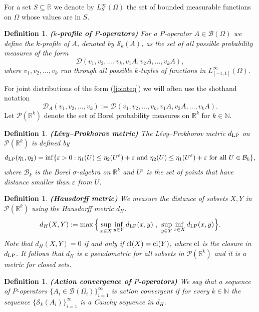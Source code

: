 \documentclass[a4wider]{amsart}
\newtheorem{definition}[theorem]{Definition}
\theoremstyle{definitionbreak}\newtheorem{D}[theorem]{Definition}
\theoremstyle{definitionbreak}\newtheorem*{D*}{Definition}
\begin{document}
For a set $S\subseteq\mathbb{R}$ we denote by $L^\infty_S(\Omega)$ the set of bounded measurable functions on $\Omega$ whose values are in $S$.

\begin{definition} {\bf ($k$-profile of $P$-operators)} For a $P$-operator $A\in\mathcal{B}(\Omega)$ we define the $k$-profile of $A$, denoted by $\mathcal{S}_k(A)$, as the set of all possible probability measures of the form
\begin{equation}\label{jointeq}
\mathcal{D}(v_1,v_2,\dots,v_k,v_1A,v_2A,\dots,v_kA),
\end{equation}
where $v_1,v_2,\dots,v_k$ run through all possible $k$-tuples of functions in $L^\infty_{[-1,1]}(\Omega)$.
\end{definition}    

For joint distributions of the form (\ref{jointeq}) we will often use the shothand notation
$$\mathcal{D}_A(v_1,v_2,\dots,v_k):=\mathcal{D}(v_1,v_2,\dots,v_k,v_1A,v_2A,\dots,v_kA).$$
Let $\mathcal{P}(\mathbb{R}^k)$ denote the set of Borel probability measures on $\mathbb{R}^k$ for $k\in\mathbb{N}$.

\begin{definition} {\bf (L\'evy--Prokhorov metric)} The L\'evy--Prokhorov metric $d_{\rm LP}$ on $\mathcal{P}(\mathbb{R}^k)$ is defined by
 \[d_{\rm LP}(\eta_1, \eta_2)=\inf\{\varepsilon>0: \eta_1(U)\leq \eta_2(U^{\varepsilon})+\varepsilon \text{ and } \eta_2(U)\leq \eta_1(U^{\varepsilon})+\varepsilon \text{ for all } U\in\mathcal{B}_k\},\]
where $\mathcal{B}_k$ is the Borel $\sigma$-algebra on $\mathbb{R}^k$ and $U^{\varepsilon}$ is the set of points that have distance smaller than $\varepsilon$ from $U$.
\end{definition}



\begin{definition}{\bf (Hausdorff metric)} We measure the distance of subsets $X,Y$ in $\mathcal{P}(\mathbb{R}^k)$ using the Hausdorff metric $d_H$. $$d_H(X,Y):=\max\Big\{\sup_{x\in X}\inf_{y\in Y} d_{\rm LP}(x,y)~,~\sup_{y\in Y}\inf_{x\in X} d_{\rm LP}(x,y)\Big\}.$$ Note that $d_H(X,Y)=0$ if and only if ${\rm cl}(X)={\rm cl}(Y)$, where ${\rm cl}$ is the closure in $d_{\rm LP}$. It follows that $d_H$ is a pseudometric for all subsets in $\mathcal{P}(\mathbb{R}^k)$ and it is a metric for closed sets.
\end{definition}

\begin{definition}\label{limconv} {\bf (Action convergence of $P$-operators)} We say that a sequence of $P$-operators $\{A_i\in\mathcal{B}(\Omega_i)\}_{i=1}^\infty$ is action convergent if for every $k\in\mathbb{N}$ the sequence $\{\mathcal{S}_k(A_i)\}_{i=1}^\infty$ is a Cauchy sequence in $d_H$. 
\end{definition}
\end{document}
